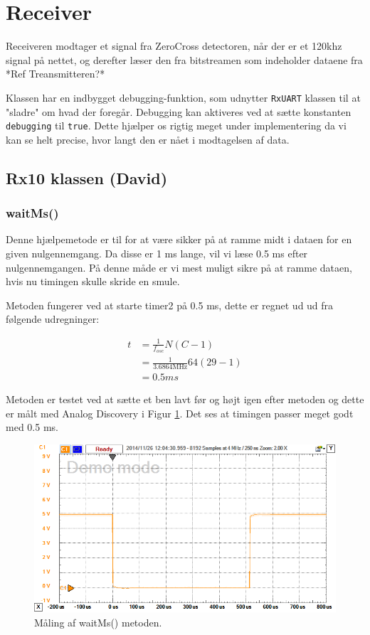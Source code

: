 \section{Receiver} \label{Rx}
Receiveren modtager et signal fra ZeroCross detectoren, når der er et 120khz signal på nettet, og derefter læser den fra bitstreamen som indeholder dataene fra *Ref Treansmitteren?*

Klassen har en indbygget debugging-funktion, som udnytter \texttt{RxUART} klassen til at "sladre" om hvad der foregår. Debugging kan aktiveres ved at sætte konstanten \texttt{debugging} til \texttt{true}. Dette hjælper os rigtig meget under implementering da vi kan se helt precise, hvor langt den er nået i modtagelsen af data.

\subsection{Rx10 klassen (David)}

\subsubsection{waitMs()}

Denne hjælpemetode er til for at være sikker på at ramme midt i dataen for en given nulgennemgang.
Da disse er 1 ms lange, vil vi læse 0.5 ms efter nulgennemgangen.
På denne måde er vi mest muligt sikre på at ramme dataen, hvis nu timingen skulle skride en smule.

Metoden fungerer ved at starte timer2 på 0.5 ms, dette er regnet ud ud fra følgende udregninger:

\begin{align*}
t &= \frac{1}{f_{osc}} N (C - 1)\\
 &= \frac{1}{3.6864 \text{MHz}} 64 (29 - 1) \\
 &= 0.5 ms
\end{align*}

Metoden er testet ved at sætte et ben lavt før og højt igen efter metoden og dette er målt med Analog Discovery i Figur \ref{fig:RxwaitMStest}. 
Det ses at timingen passer meget godt med 0.5 ms.

\begin{figure}[h]
\centering
\includegraphics[width=\textwidth]{../Implementering/SW_implementering/Receiver/Rx10}
\caption{Måling af waitMs() metoden.}
\label{fig:RxwaitMStest}
\end{figure}

